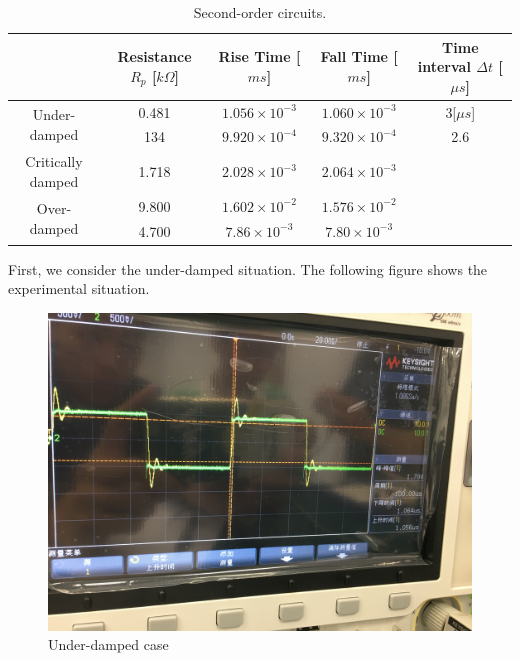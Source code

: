 \documentclass{article}
\begin{document}
\begin{table}[htp]

\begin{center}

\begin{tabular}{|c|c|c|c|c|}

\hline

& Resistance $R_p$ [$k\Omega$] & Rise Time [$ms$] & Fall Time [$ms$] & Time interval $\Delta t$ [$\mu s$] \\

\hline

\multirow{2}{*}{Under-damped}		&	0.481	&	$1.056\times 10^{-3}$	&	$1.060\times 10^{-3}$	&	3[$\mu s$]	\\

\cline{2-5}

&	134	&	$9.920\times 10^{-4}$	&	$9.320\times 10^{-4}$	&	2.6	\\

\hline

Critically damped	&	1.718	&	$2.028\times 10^{-3}$	&	$2.064\times 10^{-3}$	&	\multirow{3}{*}{\diagbox[height=3.5em,width=11em,dir=SE]{}{}}\\

\cline{1-4}

\multirow{2}{*}{Over-damped}	&	9.800	&	$1.602\times 10^{-2}$	&	$1.576\times 10^{-2}$	&	\\

\cline{2-4}

&	4.700	&	$7.86\times 10^{-3}$	&	$7.80\times 10^{-3}$	&	\\

\hline

\end{tabular}

\caption{Second-order circuits.}

\label{tab-2}

\end{center}

\end{table}

First, we consider the under-damped situation. The following figure shows the experimental situation.

  \begin{figure}[H]
  \centering
  \includegraphics[width=.6\textwidth]{Figure3.jpg}
  \caption{Under-damped case}
  \label{img} 
\end{figure}
\end{document}
